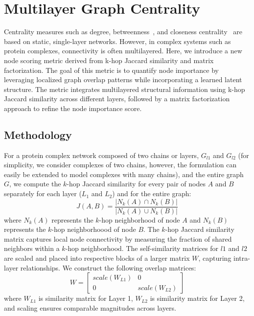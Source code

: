 \documentclass[10pt,letterpaper]{article}
\begin{document}
\section*{Multilayer Graph Centrality}

Centrality measures such as degree, betweenness~\cite{newman12012networks}, and closeness centrality~\cite{newman12012networks} are based on static, single-layer networks. However, in complex systems such as protein complexes, connectivity is often multilayered. 
Here, we introduce a new node scoring metric derived from k-hop Jaccard similarity and matrix factorization. The goal of this metric is to quantify node importance by leveraging localized graph overlap patterns while incorporating a learned latent structure.
The metric integrates multilayered structural information using k-hop Jaccard similarity across different layers, followed by a matrix factorization approach to refine the node importance score.

\subsection*{Methodology}
For a protein complex network composed of two chains or layers, $G_{l1}$ and $G_{l2}$ (for simplicity, we consider complexes of two chains, however, the formulation can easily be extended to model complexes with many chains), and the entire graph $G$, we compute the $k$-hop Jaccard similarity for every pair of nodes $A$ and $B$ separately for each layer ($L_1$ and $L_2$) and for the entire graph:
\[
J(A,B) = \frac{|N_k(A) \cap N_k(B)|}{|N_k(A) \cup N_k(B)|}
\]
where $N_k(A)$ represents the $k$-hop neighborhood of node $A$ and $N_k(B)$ represents the $k$-hop neighborhoood of node $B$. The $k$-hop Jaccard similarity matrix captures local node connectivity by measuring the fraction of shared neighbors within a $k$-hop neighborhood.
The self-similarity matrices for $l1$ and $l2$ are scaled and placed into respective blocks of a larger matrix $W$, capturing intra-layer relationships.
We construct the following overlap matrices:
\[W = 
\begin{bmatrix}
scale(W_{L1}) & 0 \\
0 & scale(W_{L2})
\end{bmatrix}
\]
where $W_{L1}$ is similarity matrix for Layer 1, $W_{L2}$ is similarity matrix for Layer 2, and scaling ensures comparable magnitudes across layers. 
\end{document}
